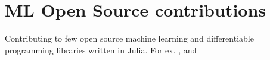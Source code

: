 \documentclass[]{deedy-resume-openfont}
\begin{document}
\begin{minipage}[t]{0.66\textwidth}



\section{ML Open Source contributions}
\vspace{\topsep}
Contributing to few open source machine learning and differentiable programming libraries written in Julia. For ex.
\href{https://github.com/FluxML/Flux.jl}{}, \href{https://github.com/FluxML/Zygote.jl}{}
and \href{https://github.com/JuliaDiff/ChainRules.jl}{}
\sectionsep



\end{minipage}
\end{document}
